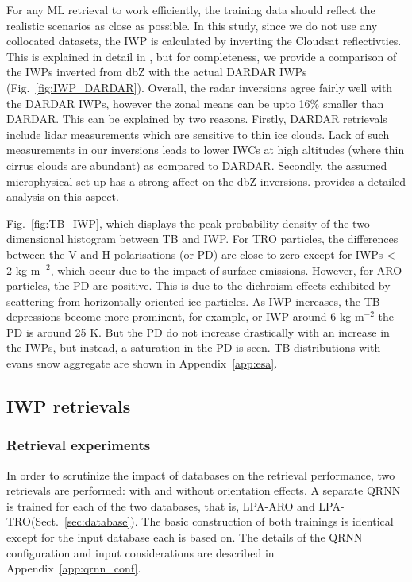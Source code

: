 \documentclass[amt, manuscript]{copernicus}
\begin{document}
For any ML retrieval to work efficiently, the training data should reflect the realistic scenarios as close as possible. In this study, since we do not use any collocated datasets, the IWP is calculated by inverting the Cloudsat reflectivties. This is explained in detail in \citet{ekelund2020using}, but for completeness, we provide a comparison of the IWPs inverted from dbZ with the actual DARDAR IWPs (Fig.~\ref{fig:IWP_DARDAR}). Overall, the radar inversions agree
fairly well with the DARDAR IWPs, however the zonal means can be upto 16\% smaller than DARDAR.  This can be explained by two reasons. Firstly, DARDAR retrievals include lidar measurements which are sensitive to thin ice clouds. Lack of such measurements in our inversions leads to lower IWCs at high altitudes (where thin cirrus clouds are abundant) as compared to DARDAR. Secondly, the assumed microphysical set-up has a strong affect on the dbZ inversions. \citet{ekelund2020using} provides a detailed analysis on this aspect.

Fig.~\ref{fig:TB_IWP}, which displays the peak probability density of the two-dimensional histogram between TB and IWP. For TRO particles, the differences between the V  and H  polarisations (or PD) are close to zero except for IWPs < 2\,\,kg m$^{-2}$, which occur due to the impact of surface emissions. However, for ARO particles, the PD are positive. This is due to the dichroism effects exhibited by scattering from horizontally oriented ice particles. As IWP increases, the TB depressions become more prominent, for example, or IWP around 6\,\,kg m$^{-2}$ the PD is around 25\,\,K. But the PD do not increase drastically with an increase in the IWPs, but instead, a saturation in the PD is seen. TB distributions with evans snow aggregate are shown in Appendix~\ref{app:esa}.

\subsection{IWP retrievals}
%
\label{sec:iwp_retrievals}

\subsubsection{Retrieval experiments}
%
In order to scrutinize the impact of databases on the retrieval performance, two retrievals are performed: with and without orientation effects. A separate QRNN is trained for each of the two databases, that is, LPA-ARO and LPA-TRO(Sect.~\ref{sec:database}). The basic construction of both trainings is identical except for the input database each is based on. The details of the QRNN configuration and input considerations are described in  Appendix~\ref{app:qrnn_conf}.  
\end{document}

